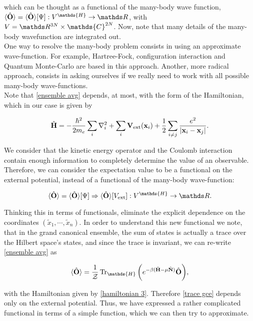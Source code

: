 \documentclass{homework}
\begin{document}
which can be thought as a functional of the many-body wave function, $\langle \hat{\bf O} \rangle = \langle \hat{\bf O} \rangle[\Psi]: {V}^{\mathds{H}} \rightarrow \R$, with $V = \R^{3N} \times \mathds {C}^{2N}$. Now, note that many details of the many-body wavefunction are integrated out. \\

One way to resolve the many-body problem consists in using an approximate wave-function. For example, Hartree-Fock, configuration interaction and Quantum Monte-Carlo are based in this approach. Another, more radical approach, consists in asking ourselves if we really need to work with all possible many-body wave-functions. \\

Note that \eqref{ensemble avg} depends, at most, with the form of the Hamiltonian, which in our case is given by 
 
\begin{equation}
    \hat{\bf H} = -\frac{\hbar^2}{2m_e} \sum_i \nabla^2_i + \sum_{i} {\bf V}_{\textnormal{ext}} ({\bf x}_i) + \frac{1}{2} \sum_{i \neq j} \frac{e^2}{|{\bf x}_i-{\bf x}_j|}.
\label{hamiltonian 3}
\end{equation}

We consider that the kinetic energy operator and the Coulomb interaction contain enough information to completely determine the value of an observable. Therefore, we can consider the expectation value to be a functional on the external potential, instead of a functional of the many-body wave-function:

$$
\langle \hat{\bf O} \rangle = \langle \hat{\bf O}  \rangle[\Psi] \Rightarrow
\langle \hat{\bf O}  \rangle[V_{\textnormal{ext}}]
: {V}^{\mathds{H}} \rightarrow \R.
$$

Thinking this in terms of functionals, eliminate the explicit dependence on the coordinates $(\tilde{x}_1, \cdots, \tilde{x}_n)$. In order to understand this new functional we note, that in the grand canonical ensemble, the sum of states is actually a trace over the Hilbert space's states, and since the trace is invariant, we can re-write \eqref{ensemble avg} as 

\begin{equation}
    \langle \hat{\bf O} \rangle = \frac{1}{\mathcal{Z}} \Tr_{\mathds{H}} \bigg(e^{-\beta(\hat{\bf H}-\mu\hat{\bf N})} \hat{\bf O} \bigg),
\label{trace gce}
\end{equation}

with the Hamiltonian given by \eqref{hamiltonian 3}. Therefore \eqref{trace gce} depends only on the external potential. Thus, we have expressed a rather complicated functional in terms of a simple function, which we can then try to approximate.
\end{document}
